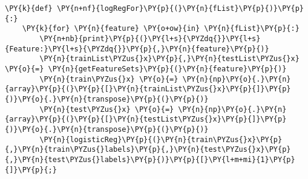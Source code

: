 {\par%
\vspace{-1\baselineskip}%
}%
\begin{notebookcell}[]%
\begin{addmargin}[\cellleftmargin]{0em}%
{\smaller%
\par%
%
\vspace{-1\smallerfontscale}%
\begin{Verbatim}[commandchars=\\\{\}]
\PY{k}{def} \PY{n+nf}{logRegFor}\PY{p}{(}\PY{n}{fList}\PY{p}{)}\PY{p}{:}
    \PY{k}{for} \PY{n}{feature} \PY{o+ow}{in} \PY{n}{fList}\PY{p}{:}
        \PY{n+nb}{print}\PY{p}{(}\PY{l+s}{\PYZdq{}}\PY{l+s}{Feature:}\PY{l+s}{\PYZdq{}}\PY{p}{,}\PY{n}{feature}\PY{p}{)}
        \PY{n}{trainList\PYZus{}x}\PY{p}{,}\PY{n}{testList\PYZus{}x} \PY{o}{=} \PY{n}{getFeatureSets}\PY{p}{(}\PY{n}{feature}\PY{p}{)}
        \PY{n}{train\PYZus{}x} \PY{o}{=} \PY{n}{np}\PY{o}{.}\PY{n}{array}\PY{p}{(}\PY{p}{[}\PY{n}{trainList\PYZus{}x}\PY{p}{]}\PY{p}{)}\PY{o}{.}\PY{n}{transpose}\PY{p}{(}\PY{p}{)}
        \PY{n}{test\PYZus{}x} \PY{o}{=} \PY{n}{np}\PY{o}{.}\PY{n}{array}\PY{p}{(}\PY{p}{[}\PY{n}{testList\PYZus{}x}\PY{p}{]}\PY{p}{)}\PY{o}{.}\PY{n}{transpose}\PY{p}{(}\PY{p}{)}
        \PY{n}{logisticReg}\PY{p}{(}\PY{n}{train\PYZus{}x}\PY{p}{,}\PY{n}{train\PYZus{}labels}\PY{p}{,}\PY{n}{test\PYZus{}x}\PY{p}{,}\PY{n}{test\PYZus{}labels}\PY{p}{)}\PY{p}{[}\PY{l+m+mi}{1}\PY{p}{]}\PY{p}{;}
\end{Verbatim}
%
\par%
\vspace{-1\smallerfontscale}}%
\end{addmargin}
\end{notebookcell}



